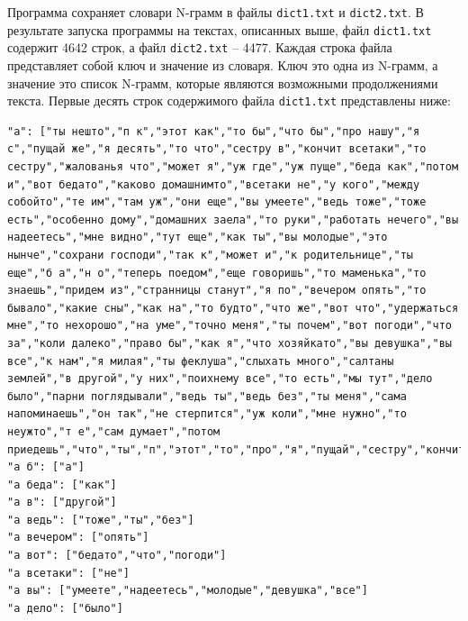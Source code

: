 \documentclass[a4paper, final]{article}
\begin{document}
Программа сохраняет словари N-грамм в файлы \texttt{dict1.txt} и \texttt{dict2.txt}. В результате запуска программы на текстах, описанных выше, файл \texttt{dict1.txt} содержит 4642 строк, а файл \texttt{dict2.txt} -- 4477. Каждая строка файла представляет собой ключ и значение из словаря. Ключ это одна из N-грамм, а значение это список N-грамм, которые являются возможными продолжениями текста. Первые десять строк содержимого файла \texttt{dict1.txt} представлены ниже:

\begin{lstlisting}[caption={Первые 10 N-грамм из словарь произведения <<Гроза>>},stringstyle=\color{black},keywordstyle=\color{black}\bfseries]
"а": ["ты нешто","п к","этот как","то бы","что бы","про нашу","я с","пущай же","я десять","то что","сестру в","кончит всетаки","то сестру","жалованья что","может я","уж где","уж пуще","беда как","потом и","вот бедато","каково домашнимто","всетаки не","у кого","между собойто","те им","там уж","они еще","вы умеете","ведь тоже","тоже есть","особенно дому","домашних заела","то руки","работать нечего","вы надеетесь","мне видно","тут еще","как ты","вы молодые","это нынче","сохрани господи","так к","может и","к родительнице","ты еще","б а","н о","теперь поедом","еще говоришь","то маменька","то знаешь","придем из","странницы станут","я по","вечером опять","то бывало","какие сны","как на","то будто","что же","вот что","удержаться мне","то нехорошо","на уме","точно меня","ты почем","вот погоди","что за","коли далеко","право бы","как я","что хозяйкато","вы девушка","вы все","к нам","я милая","ты феклуша","слыхать много","салтаны землей","в другой","у них","поихнему все","то есть","мы тут","дело было","парни поглядывали","ведь ты","ведь без","ты меня","сама напоминаешь","он так","не стерпится","уж коли","мне нужно","то неужто","т е","сам думает","потом приедешь","что","ты","п","этот","то","про","я","пущай","сестру","кончит","жалованья","может","уж","беда","потом","вот","каково","всетаки","у","между","те","там","они","вы","ведь","тоже","особенно","домашних","работать","мне","тут","как","это","сохрани","так","к","б","н","теперь","еще","придем","странницы","вечером","знаешь","какие","удержаться","на","точно","коли","право","слыхать","салтаны","в","поихнему","мы","дело","парни","сама","он","помоему","не","т","сам"]
"а б": ["а"]
"а беда": ["как"]
"а в": ["другой"]
"а ведь": ["тоже","ты","без"]
"а вечером": ["опять"]
"а вот": ["бедато","что","погоди"]
"а всетаки": ["не"]
"а вы": ["умеете","надеетесь","молодые","девушка","все"]
"а дело": ["было"]
\end{lstlisting}
\end{document}
